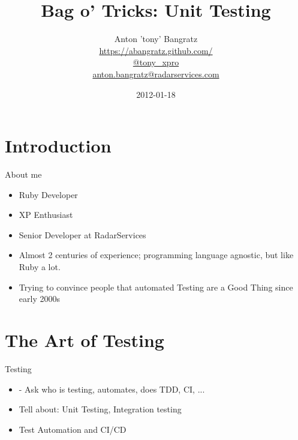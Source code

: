 \documentclass[style=paintings,display=slides,clock]{powerdot}
\title{Bag o' Tricks: Unit Testing}
\author{Anton 'tony' Bangratz\\
	\url{https://abangratz.github.com/}\\
	\url{@tony_xpro}\\
\url{anton.bangratz@radarservices.com}}
\date{2012-01-18}
\begin{document}
\maketitle
\section{Introduction}
\begin{note}{About me}
	\begin{itemize}
		\item Ruby Developer
		\item XP Enthusiast
		\item Senior Developer at RadarServices
		\item Almost 2 centuries of experience; programming language agnostic, but like Ruby a lot. 
		\item Trying to convince people that automated Testing are a Good Thing since early 2000s
	\end{itemize}
\end{note}
\section{The Art of Testing}
\begin{note}{Testing}
	\begin{itemize}
		\item - Ask who is testing, automates, does TDD, CI, ...
		\item Tell about: Unit Testing, Integration testing
		\item Test Automation and CI/CD
	\end{itemize}
\end{note}
\end{document}
